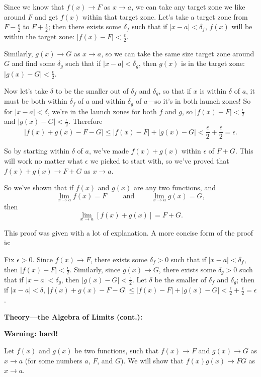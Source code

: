 \documentclass{article}
\begin{document}
Since we know that $f(x)\to F$ as $x\to a$, we can take any target zone we like around $F$ and get $f(x)$ within that target zone. Let's take a target zone from $F-\frac{\epsilon}{2}$ to $F+\frac{\epsilon}{2}$; then there exists some $\delta_f$ such that if $|x-a|<\delta_f$, $f(x)$ will be within the target zone: $|f(x)-F|<\frac{\epsilon}{2}$.

Similarly, $g(x)\to G$ as $x\to a$, so we can take the same size target zone around $G$ and find some $\delta_g$ such that if $|x-a|<\delta_g$, then $g(x)$ is in the target zone: $|g(x)-G|<\frac{\epsilon}{2}$.

Now let's take $\delta$ to be the smaller out of $\delta_f$ and $\delta_g$, so that if $x$ is within $\delta$ of $a$, it must be both within $\delta_f$ of $a$ and within $\delta_g$ of $a$---so it's in both launch zones! So for $|x-a|<\delta$, we're in the launch zones for both $f$ and $g$, so $|f(x)-F|<\frac{\epsilon}{2}$ and $|g(x)-G|<\frac{\epsilon}{2}$. Therefore
\[|f(x)+g(x)-F-G| \leq |f(x)-F|+|g(x)-G|<\frac{\epsilon}{2}+\frac{\epsilon}{2}=\epsilon.\]

So by starting within $\delta$ of $a$, we've made $f(x)+g(x)$ within $\epsilon$ of $F+G$. This will work no matter what $\epsilon$ we picked to start with, so we've proved that $f(x)+g(x)\to F+G$ as $x\to a$.\bigskip


So we've shown that if $f(x)$ and $g(x)$ are any two functions, and
\[\lim_{x\to a}f(x)=F\qquad\mbox{ and }\qquad \lim_{x\to a}g(x)=G,\]
then
\[\lim_{x\to a}[f(x)+g(x)] = F+G.\]

\bigskip

This proof was given with a lot of explanation. A more concise form of the proof is:\medskip

{\color{red}
Fix $\epsilon>0$. Since $f(x)\to F$, there exists some $\delta_f>0$ such that if $|x-a|<\delta_f$, then $|f(x)-F|<\frac{\epsilon}{2}$. Similarly, since $g(x)\to G$, there exists some $\delta_g>0$ such that if $|x-a|<\delta_g$, then $|g(x)-G|<\frac{\epsilon}{2}$. Let $\delta$ be the smaller of $\delta_f$ and $\delta_g$; then if $|x-a|<\delta$, $|f(x)+g(x)-F-G|\leq |f(x)-F|+|g(x)-G|<\frac{\epsilon}{2}+\frac{\epsilon}{2}=\epsilon$.
}

\clearpage





\textbf{Theory---the Algebra of Limits (cont.):}\medskip

\textbf{Warning: hard!}\medskip

Let $f(x)$ and $g(x)$ be two functions, such that $f(x)\to F$ and $g(x)\to G$ as $x\to a$ (for some numbers $a$, $F$, and $G$). We will show that $f(x)g(x)\to FG$ as $x\to a$.
\end{document}
